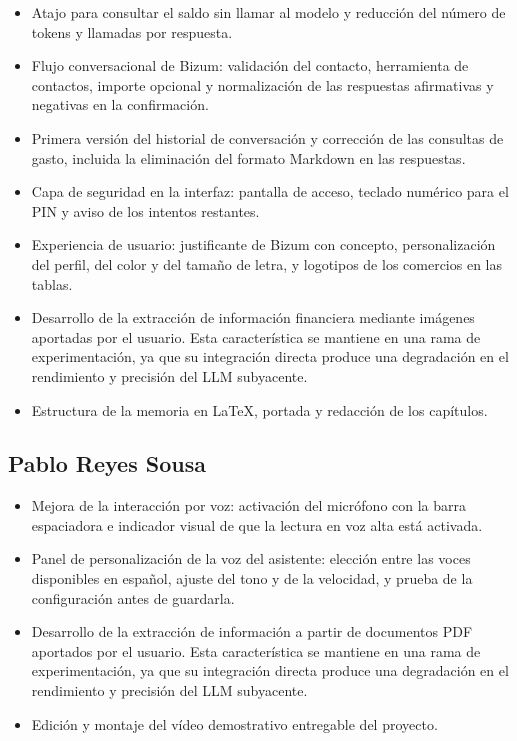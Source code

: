 \begin{itemize}
    \item Atajo para consultar el saldo sin llamar al modelo y reducción del
    número de tokens y llamadas por respuesta.
    \item Flujo conversacional de Bizum: validación del contacto, herramienta de
    contactos, importe opcional y normalización de las respuestas afirmativas y
    negativas en la confirmación.
    \item Primera versión del historial de conversación y corrección de las
    consultas de gasto, incluida la eliminación del formato Markdown en las
    respuestas.
    \item Capa de seguridad en la interfaz: pantalla de acceso, teclado numérico
    para el PIN y aviso de los intentos restantes.
    \item Experiencia de usuario: justificante de Bizum con concepto,
    personalización del perfil, del color y del tamaño de letra, y logotipos de
    los comercios en las tablas.
    \item Desarrollo de la extracción de información financiera mediante imágenes 
    aportadas por el usuario. Esta característica se mantiene en una rama de 
    experimentación, ya que su integración directa produce una degradación en el 
    rendimiento y precisión del LLM subyacente.
    \item Estructura de la memoria en \LaTeX{}, portada y redacción de los
    capítulos.

     
    
\end{itemize}

\subsection{Pablo Reyes Sousa}

\begin{itemize}
    \item Mejora de la interacción por voz: activación del micrófono con la
    barra espaciadora e indicador visual de que la lectura en voz alta está
    activada.
    \item Panel de personalización de la voz del asistente: elección entre las
    voces disponibles en español, ajuste del tono y de la velocidad, y prueba de
    la configuración antes de guardarla.

    \item Desarrollo de la extracción de información a partir de documentos PDF 
    aportados por el usuario. Esta característica se mantiene en una rama de 
    experimentación, ya que su integración directa produce una degradación en el 
    rendimiento y precisión del LLM subyacente.

    \item Edición y montaje del vídeo demostrativo entregable del proyecto.
\end{itemize}

